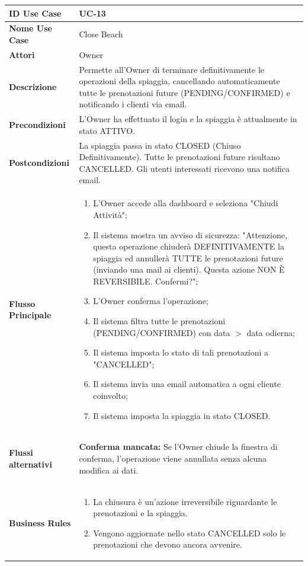 \documentclass{article}
\newcommand{\usecasetable}[9]{
	\begin{table}[h!]
		\centering
		\footnotesize
		\renewcommand{\arraystretch}{1.4}
		\begin{tabularx}{\textwidth}{|l|>{\raggedright\arraybackslash}X|}
			\hline
			\textbf{ID Use Case} & #1 \\ \hline
			\textbf{Nome Use Case} & #2 \\ \hline
			\textbf{Attori} & #3 \\ \hline
			\textbf{Descrizione} & #4 \\ \hline
			\textbf{Precondizioni} & #5 \\ \hline
			\textbf{Postcondizioni} & #6 \\ \hline
			\textbf{Flusso Principale} & #7 \\ \hline
			\textbf{Flussi alternativi} & #8 \\ \hline
			\textbf{Business Rules} & #9 \\ \hline
		\end{tabularx}
	\end{table}
}
\begin{document}
		
	\newpage
	
	\usecasetable
	{UC-13}
	{Close Beach}
	{Owner}
	{Permette all'Owner di terminare definitivamente le operazioni della spiaggia, cancellando automaticamente tutte le prenotazioni future (PENDING/CONFIRMED) e notificando i clienti via email.}
	{L'Owner ha effettuato il login e la spiaggia è attualmente in stato ATTIVO.}
	{La spiaggia passa in stato CLOSED (Chiuso Definitivamente). Tutte le prenotazioni future risultano CANCELLED. Gli utenti interessati ricevono una notifica email.}
	{
		\begin{enumerate}[nosep, leftmargin=*]
			\item L'Owner accede alla dashboard e seleziona "Chiudi Attività";
			\item Il sistema mostra un avviso di sicurezza: "Attenzione, questa operazione chiuderà DEFINITIVAMENTE la spiaggia ed annullerà TUTTE le prenotazioni future (inviando una mail ai clienti). Questa azione NON È REVERSIBILE. Confermi?";
			\item L'Owner conferma l'operazione;
			\item Il sistema filtra tutte le prenotazioni (PENDING/CONFIRMED) con data $>$ data odierna;
			\item Il sistema imposta lo stato di tali prenotazioni a "CANCELLED";
			\item Il sistema invia una email automatica a ogni cliente coinvolto;
			\item Il sistema imposta la spiaggia in stato CLOSED.
		\end{enumerate}
	}
	{
		\begin{description}[nosep, leftmargin=25px]
			\item[\textbf{3a-e.}] \textbf{Conferma mancata:} Se l'Owner chiude la finestra di conferma, l'operazione viene annullata senza alcuna modifica ai dati.
		\end{description}
	}
	{
		\begin{enumerate}[nosep, leftmargin=*]
			\item[•] La chiusura è un'azione irreversibile riguardante le prenotazioni e la spiaggia. 
			\item[•] Vengono aggiornate nello stato CANCELLED solo le prenotazioni che devono ancora avvenire.
		\end{enumerate}
	}
		
	\newpage
	
\end{document}
